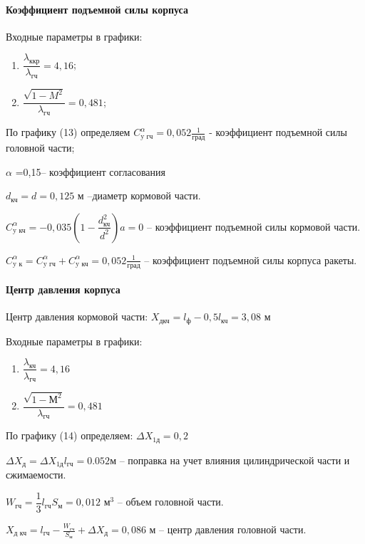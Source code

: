 \clearpage
\paragraph{Коэффициент подъемной силы корпуса}

Входные параметры в графики:
\begin{enumerate}
	\item $ \dfrac{\lambda_\text{ккр}}{\lambda_\text{гч}} = 4,16$;
	\item $ \dfrac{\sqrt{1-M^2}}{\lambda_\text{гч}} = 0,481$;
\end{enumerate}

По графику (13) \cite{Astakhova} определяем $C_\text{y гч}^\alpha = 0,052 \frac{1}{\text{град}} $ - коэффициент подъемной силы головной части;

$\alpha$ =0,15– коэффициент согласования

$d_\text{кч}=d=0,125$ м –диаметр кормовой части.

$C_\text{y кч}^\alpha=-0,035 \left(1-\dfrac{d_\text{кч}^2}{d^2} \right) a=0$ – коэффициент подъемной силы кормовой части.

$C_\text{y к}^\alpha=C_\text{y гч}^\alpha + C_\text{y кч}^\alpha = 0,052 \frac{1}{град}$ – коэффициент подъемной силы корпуса ракеты.

\paragraph{Центр давления корпуса}

Центр давления кормовой части: $X_\text{дкч}=l_\text{ф}- 0,5 l_\text{кч}=3,08$ м

Входные параметры в графики:
\begin{enumerate}
	\item $\dfrac{\lambda_\text{кч}} {\lambda_\text{гч}} =4,16$
	\item $\dfrac{\sqrt{1-М^2}}{\lambda_\text{гч}} =0,481$
\end{enumerate}

По графику (14) \cite{Astakhova} определяем: $\Delta X_\text{1д}=0,2$

$\Delta X_\text{д}= \Delta X_\text{1д} l_\text{гч}=0.052 м$ – поправка на учет влияния цилиндрической части и сжимаемости.

$W_\text{гч}=\dfrac{1}{3} l_\text{гч} S_\text{м}=0,012 \text{ м}^3$ – объем головной части.

$X_\text{д кч}=l_\text{гч}- \frac{W_\text{гч}}{S_\text{м}} + \Delta X_\text{д}=0,086$ м – центр давления головной части.

